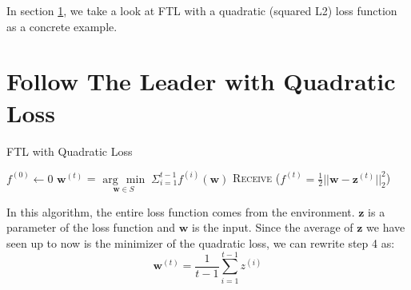 \documentclass[11pt]{article}
\newcommand{\argmin}[1]{\underset{#1}{\operatorname{arg}\,\operatorname{min}}\;}
\begin{document}
\noindent
In section \ref{sec:ftl_quad_loss}, we take a look at FTL with a quadratic (squared L2) loss function as a concrete example.

\section{Follow The Leader with Quadratic Loss}
\label{sec:ftl_quad_loss}

\begin{algorithm}
  \caption{FTL with Quadratic Loss}\label{euclid}
  \begin{algorithmic}[1]
    \State $f^{(0)} \leftarrow 0$
            \State $\bm{w}^{(t)}$ = $\argmin{\bm{w} \in S} \Sigma^{t-1}_{i=1} f^{(i)} (\bm{w})$ 
            \State \textsc{Receive} ($f^{(t)} = \frac{1}{2}||\bm{w} - \bm{z}^{(t)}||_2^2$) 
        \EndFor
    \EndFunction
  \end{algorithmic}
\end{algorithm}
 
\noindent In this algorithm, the entire loss function comes from the environment. $\bm{z}$ is a parameter of the loss function and $\bm{w}$ is the input. Since the average of $\bm{z}$ we have seen up to now is the minimizer of the quadratic loss, we can rewrite step 4 as:
\begin{equation*}
    \bm{w}^{(t)} = \frac{1}{t-1}\sum^{t-1}_{i=1}z^{(i)}
\end{equation*}
\end{document}
